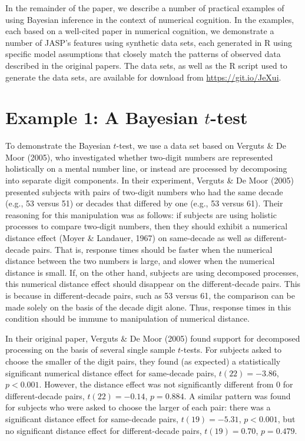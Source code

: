 \documentclass[english,,doc,floatsintext]{apa6}
\begin{document}
In the remainder of the paper, we describe a number of practical examples of using Bayesian inference in the context of numerical cognition. In the examples, each based on a well-cited paper in numerical cognition, we demonstrate a number of JASP's features using synthetic data sets, each generated in R using specific model assumptions that closely match the patterns of observed data described in the original papers. The data sets, as well as the R script used to generate the data sets, are available for download from \url{https://git.io/JeXui}.

\hypertarget{example-1-a-bayesian-t-test}{%
\section{\texorpdfstring{Example 1: A Bayesian \(t\)-test}{Example 1: A Bayesian t-test}}\label{example-1-a-bayesian-t-test}}

To demonstrate the Bayesian \(t\)-test, we use a data set based on Verguts \& De Moor (2005), who investigated whether two-digit numbers are represented holistically on a mental number line, or instead are processed by decomposing into separate digit components. In their experiment, Verguts \& De Moor (2005) presented subjects with pairs of two-digit numbers who had the same decade (e.g., 53 versus 51) or decades that differed by one (e.g., 53 versus 61). Their reasoning for this manipulation was as follows: if subjects are using holistic processes to compare two-digit numbers, then they should exhibit a numerical distance effect (Moyer \& Landauer, 1967) on same-decade as well as different-decade pairs. That is, response times should be faster when the numerical distance between the two numbers is large, and slower when the numerical distance is small. If, on the other hand, subjects are using decomposed processes, this numerical distance effect should disappear on the different-decade pairs. This is because in different-decade pairs, such as 53 versus 61, the comparison can be made solely on the basis of the decade digit alone. Thus, response times in this condition should be immune to manipulation of numerical distance.

In their original paper, Verguts \& De Moor (2005) found support for decomposed processing on the basis of several single sample \(t\)-tests. For subjects asked to choose the smaller of the digit pairs, they found (as expected) a statistically significant numerical distance effect for same-decade pairs, \(t(22) = -3.86\), \(p<0.001\). However, the distance effect was not significantly different from 0 for different-decade pairs, \(t(22)=-0.14\), \(p=0.884\). A similar pattern was found for subjects who were asked to choose the larger of each pair: there was a significant distance effect for same-decade pairs, \(t(19)=-5.31\), \(p<0.001\), but no significant distance effect for different-decade pairs, \(t(19)=0.70\), \(p=0.479\).
\end{document}
